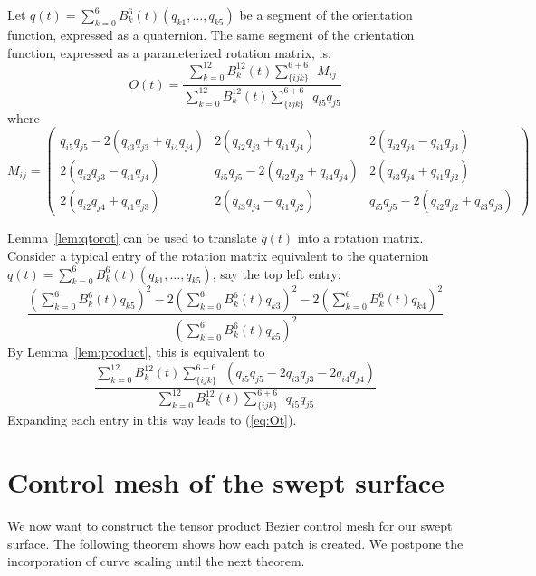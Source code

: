 \begin{lemma}
\label{lem:Mij}
Let $q(t) = \sum_{k=0}^6 B_k^6(t) (q_{k1},\ldots,q_{k5})$
be a segment of the orientation function, expressed as a quaternion.
The same segment of the orientation function, expressed as a parameterized
rotation matrix, is:
\begin{equation}
\label{eq:Ot}
O(t) = \frac{\sum_{k=0}^{12} B_k^{12}(t) \sum_{\{ijk\}}^{6+6}\ \ M_{ij}}
	    {\sum_{k=0}^{12} B_k^{12}(t) \sum_{\{ijk\}}^{6+6} \ \ q_{i5}q_{j5}}
\end{equation}
where
\begin{equation}
	M_{ij} = \left( \begin{array}{ccc}
	q_{i5}q_{j5} - 2(q_{i3}q_{j3} + q_{i4}q_{j4}) &
	2(q_{i2}q_{j3} + q_{i1}q_{j4}) &
	2(q_{i2}q_{j4} - q_{i1}q_{j3}) \\
	2(q_{i2}q_{j3} - q_{i1}q_{j4}) &
	q_{i5}q_{j5} - 2(q_{i2}q_{j2} + q_{i4}q_{j4}) &
	2(q_{i3}q_{j4} + q_{i1}q_{j2}) \\
	2(q_{i2}q_{j4} + q_{i1}q_{j3}) &
	2(q_{i3}q_{j4} - q_{i1}q_{j2}) &
	q_{i5}q_{j5} - 2(q_{i2}q_{j2} + q_{i3}q_{j3}) 
	\end{array} \right)
\end{equation}
\end{lemma}
\prf
Lemma~\ref{lem:qtorot} can be used to translate $q(t)$ 
into a rotation matrix.
Consider a typical entry of the rotation matrix equivalent 
to the quaternion $q(t) = \sum_{k=0}^6 B_k^6(t) (q_{k1},\ldots,q_{k5})$,
say the top left entry:
\[
\frac{	(\sum_{k=0}^6 B_k^6(t) q_{k5})^2 - 
	2(\sum_{k=0}^6 B_k^6(t) q_{k3})^2 - 2(\sum_{k=0}^6 B_k^6(t) q_{k4})^2}
     {  (\sum_{k=0}^6 B_k^6(t) q_{k5})^2 }
\]
By Lemma~\ref{lem:product}, this is equivalent to
\[
\frac{	\sum_{k=0}^{12} B_k^{12}(t) \sum_{\{ijk\}}^{6+6}
	\ \ (q_{i5} q_{j5} - 2q_{i3}q_{j3} - 2q_{i4}q_{j4}) }
     {  \sum_{k=0}^{12} B_k^{12}(t) \sum_{\{ijk\}}^{6+6} \ \ q_{i5} q_{j5}} 
\]
Expanding each entry in this way leads to (\ref{eq:Ot}).
\QED

\section{Control mesh of the swept surface}
\label{sec:mesh}

We now want to construct the tensor product Bezier control mesh 
for our swept surface.
The following theorem shows how each patch is created.
We postpone the incorporation of curve scaling until the next theorem.

